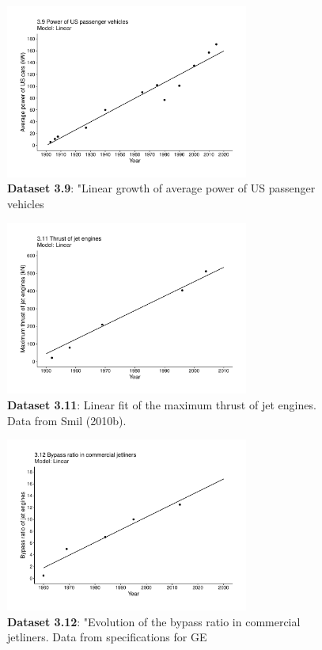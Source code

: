 \documentclass[aps,rmp,preprint,superscriptaddress,10pt,onecolumn]{article}
\begin{document}
\begin{figure}[h]
\includegraphics[width=8cm]{output/figs-ggplot/3.9.pdf}
\caption{\textbf{Dataset 3.9}: "Linear growth of average power of US passenger vehicles}
\end{figure}
	
\begin{figure}[h]
\includegraphics[width=8cm]{output/figs-ggplot/3.11.pdf}
\caption{\textbf{Dataset 3.11}: Linear fit of the maximum thrust of jet engines. Data from Smil (2010b).}
\end{figure}
	
\begin{figure}[h]
\includegraphics[width=8cm]{output/figs-ggplot/3.12.pdf}
\caption{\textbf{Dataset 3.12}: "Evolution of the bypass ratio in commercial jetliners. Data from specifications for GE}
\end{figure}
	
\end{document}
